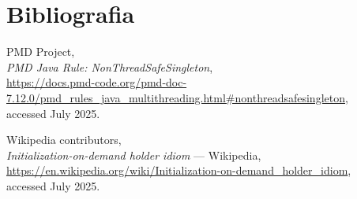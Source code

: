 \documentclass[a4paper,12pt]{report}
\begin{document}
\chapter{Bibliografia}
\begin{thebibliography}{9}

    PMD Project,\\
    \emph{PMD Java Rule: NonThreadSafeSingleton},\\
    \url{https://docs.pmd-code.org/pmd-doc-7.12.0/pmd_rules_java_multithreading.html#nonthreadsafesingleton},\\
    accessed July 2025.
    
    Wikipedia contributors,\\
    \emph{Initialization-on-demand holder idiom} --- Wikipedia,\\
    \url{https://en.wikipedia.org/wiki/Initialization-on-demand_holder_idiom},\\
    accessed July 2025.

    \end{thebibliography}
\end{document}
